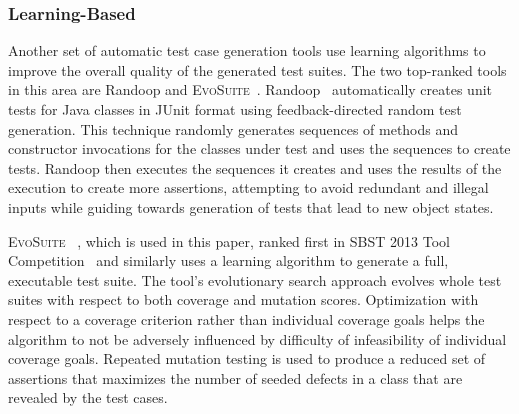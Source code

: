 \subsubsection{Learning-Based}
Another set of automatic test case generation tools use learning algorithms to improve the overall quality of the generated test suites.  The two top-ranked tools in this area are Randoop and \textsc{EvoSuite}~\cite{fraser2013a}.  Randoop~\cite{pacheco2007feedback} automatically creates unit tests for Java classes in JUnit format using feedback-directed random test generation. This technique randomly generates sequences of methods and constructor invocations for the classes under test and uses the sequences to create tests. Randoop then executes the sequences it creates and uses the results of the execution to create more assertions, attempting to  avoid redundant and illegal inputs while guiding towards generation of tests that lead to new object states. 

\textsc{EvoSuite}~\cite{fraser:2011:eat:2025113.2025179} , which is used in this paper, ranked first in SBST 2013 Tool Competition~\cite{fraser2013a} and similarly uses a learning algorithm to generate a full, executable test suite.  The tool's evolutionary search approach evolves whole test suites with respect to both coverage and mutation scores.  Optimization with respect to a coverage criterion rather than individual coverage goals helps the algorithm to not be adversely influenced by difficulty of infeasibility of individual coverage goals.  Repeated mutation testing is used to produce a reduced set of assertions that maximizes the number of seeded defects in a class that are revealed by the test cases.

